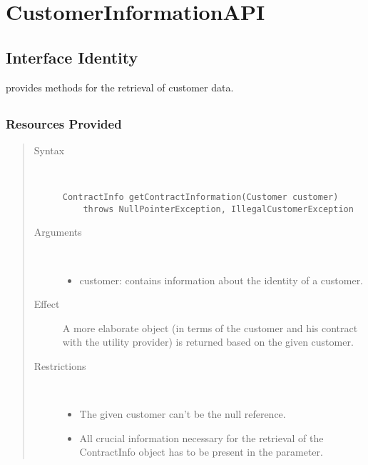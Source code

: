 \section{CustomerInformationAPI}
\label{api:other-customer-information}

\subsection{Interface Identity}

\npar {} provides methods for the retrieval of
customer data.

\subsection{}

\subsubsection{Resources Provided}

\begin{quote}
	\begin{description}
		\item[Syntax] \
		\begin{verbatim}
ContractInfo getContractInformation(Customer customer)
    throws NullPointerException, IllegalCustomerException
		\end{verbatim}
		\item[Arguments] \
		\begin{itemize}
		  \item customer: contains information about the identity of a customer.
		\end{itemize}
		\item[Effect] A more elaborate object (in terms of the customer and his
		contract with the utility provider) is returned based on the given customer. 
		\item[Restrictions] \
		\begin{itemize}
		  \item The given customer can't be the null reference.
		  \item All crucial information necessary for the retrieval of the
		  ContractInfo object has to be present in the parameter.
		\end{itemize}
	\end{description} 
\end{quote}

